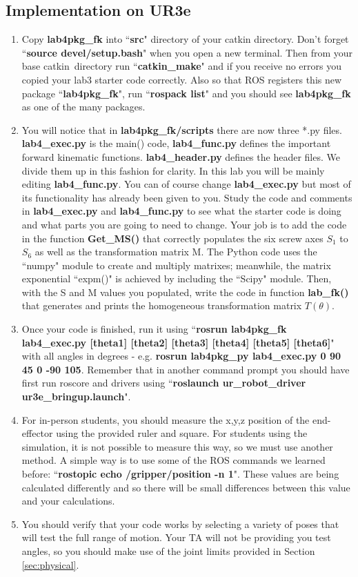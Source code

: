 \subsection{Implementation on UR3e}
\begin{enumerate}
\item Copy \textbf{lab4pkg\_fk} into ``\textbf{src}" directory of your catkin directory.  Don't forget ``\textbf{source devel/setup.bash}" when you open a new terminal.  Then from your base catkin\
directory run ``\textbf{catkin\_make}" and if you receive no errors you copied your lab3 starter code correctly.  Also so that ROS registers this new package ``\textbf{lab4pkg\_fk}",
run ``\textbf{rospack list}" and you should see \textbf{lab4pkg\_fk} as one of the many packages.
\item You will notice that in \textbf{lab4pkg\_fk/scripts} there are now three *.py files.  \textbf{lab4\_exec.py} is the main() code, \textbf{lab4\_func.py} defines the important
forward kinematic functions. \textbf{lab4\_header.py} defines the header files.  We divide them up in this fashion for clarity.  In this lab you will be mainly editing
\textbf{lab4\_func.py}.  You can of course change \textbf{lab4\_exec.py} but most of its functionality has already been given to you.  Study the code and comments in
\textbf{lab4\_exec.py} and \textbf{lab4\_func.py} to see what the starter code is doing and what parts you are going to need to change. Your job is to add the code in the function \textbf{Get\_MS()} that correctly populates the six screw axes $S_1$ to $S_6$ as well as the transformation matrix M.  The Python code uses the ``numpy" module to create and multiply matrixes; meanwhile, the matrix exponential ``expm()" is achieved by including the ``Scipy" module.  Then, with the S and M values you populated, write the code in function \textbf{lab\_fk()} that generates and prints the homogeneous transformation matrix $T(\theta)$.

\item Once your code is finished, run it using ``\textbf{rosrun lab4pkg\_fk lab4\_exec.py [theta1] [theta2] [theta3] [theta4] [theta5] [theta6]}" with all angles in
degrees - e.g. \textbf{rosrun lab4pkg\_py lab4\_exec.py 0 90 45 0 -90 105}.  Remember that in another command prompt you should have first run roscore and drivers using
``\textbf{roslaunch ur\_robot\_driver ur3e\_bringup.launch}".

\item For in-person students, you should measure the x,y,z position of the end-effector using the provided ruler and square.  For students using the simulation, it is not possible to measure this way, so we must use another method.  A simple way is to use some of the ROS commands we learned before: ``\textbf{rostopic echo /gripper/position -n 1}".  These values are being calculated differently and so there will be small differences between this value and your calculations.
\item You should verify that your code works by selecting a variety of poses that will test the full range of motion.  Your TA will not be providing you test angles, so you should make use of the joint limits provided in Section \ref{sec:physical}.

\end{enumerate}
